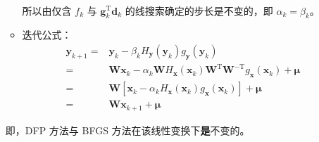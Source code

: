 \documentclass[cn,mtpro2,12pt]{elegantbook}
\begin{document}
\begin{solution}
\begin{enumerate}
\begin{itemize}
\begin{equation}
\begin{aligned}
                            \end{aligned}
                        \end{equation}
                        所以由仅含 $f_{k}$ 与 $\mathbf{g}_{k}^{\mathrm{T}}\mathbf{d}_{k}$ 的线搜索确定的步长是不变的，即 $\alpha_{k}=\beta_{k}$。
                  \item 迭代公式：
                        \begin{equation}
                            \begin{aligned}
                                \mathbf{y}_{k+1}= & \mathbf{y}_{k}-\beta_{k}H_{\mathbf{y}}(\mathbf{y}_{k})g_{\mathbf{y}}(\mathbf{y}_{k})                                                                                      \\
                                =                 & \mathbf{W}\mathbf{x}_{k}-\alpha_{k}\mathbf{W}H_{\mathbf{x}}(\mathbf{x}_{k})\mathbf{W}^{\mathrm{T}}\mathbf{W}^{-\mathrm{T}}g_{\mathbf{x}}(\mathbf{x}_{k})+\boldsymbol{\mu} \\
                                =                 & \mathbf{W}\left[\mathbf{x}_{k}-\alpha_{k}H_{\mathbf{x}}(\mathbf{x}_{k})g_{\mathbf{x}}(\mathbf{x}_{k})\right]+\boldsymbol{\mu}                                             \\
                                =                 & \mathbf{W}\mathbf{x}_{k+1}+\boldsymbol{\mu}
                            \end{aligned}
                        \end{equation}
              \end{itemize}
              即，DFP 方法与 BFGS 方法在该线性变换下\textbf{是}不变的。
    \end{enumerate}
\end{solution}
\end{document}
